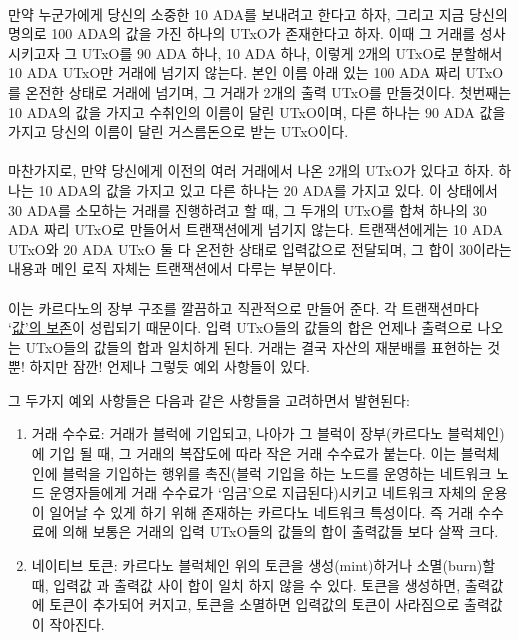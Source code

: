 \documentclass[a4paper, 11pt]{article}
\begin{document}
    \paragraph{} 만약 누군가에게 당신의 소중한 10 ADA를 보내려고 한다고 하자, 그리고 지금 당신의 명의로 100 ADA의 값을 가진 하나의 UTxO가 존재한다고 하자. 이때 그 거래를 성사 시키고자 그 UTxO를 90 ADA 하나, 10 ADA 하나, 이렇게 2개의 UTxO로 분할해서 10 ADA UTxO만 거래에 넘기지 않는다. 본인 이름 아래 있는 100 ADA 짜리 UTxO를 온전한 상태로 거래에 넘기며, 그 거래가 2개의 출력 UTxO를 만들것이다. 첫번째는 10 ADA의 값을 가지고 수취인의 이름이 달린 UTxO이며, 다른 하나는 90 ADA 값을 가지고 당신의 이름이 달린 거스름돈으로 받는 UTxO이다.

    \paragraph{} 마찬가지로, 만약 당신에게 이전의 여러 거래에서 나온 2개의 UTxO가 있다고 하자. 하나는 10 ADA의 값을 가지고 있고 다른 하나는 20 ADA를 가지고 있다. 이 상태에서 30 ADA를 소모하는 거래를 진행하려고 할 때, 그 두개의 UTxO를 합쳐 하나의 30 ADA 짜리 UTxO로 만들어서 트랜잭션에게 넘기지 않는다. 트랜잭션에게는 10 ADA UTxO와 20 ADA UTxO 둘 다 온전한 상태로 입력값으로 전달되며, 그 합이 30이라는 내용과 메인 로직 자체는 트랜잭션에서 다루는 부분이다.

    \paragraph{} 이는 카르다노의 장부 구조를 깔끔하고 직관적으로 만들어 준다. 각 트랜잭션마다 `\uline{값'의 보존}이 성립되기 때문이다. 입력 UTxO들의 값들의 합은 언제나 출력으로 나오는 UTxO들의 값들의 합과 일치하게 된다. 거래는 결국 자산의 재분배를 표현하는 것 뿐! 하지만 잠깐! 언제나 그렇듯 예외 사항들이 있다.

    그 두가지 예외 사항들은 다음과 같은 사항들을 고려하면서 발현된다:
    \begin{enumerate}
        \item 거래 수수료: 거래가 블럭에 기입되고, 나아가 그 블럭이 장부(카르다노 블럭체인)에 기입 될 때, 그 거래의 복잡도에 따라 작은 거래 수수료가 붙는다. 이는 블럭체인에 블럭을 기입하는 행위를 촉진(블럭 기입을 하는 노드를 운영하는 네트워크 노드 운영자들에게 거래 수수료가 `임금'으로 지급된다)시키고 네트워크 자체의 운용이 일어날 수 있게 하기 위해 존재하는 카르다노 네트워크 특성이다. 즉 거래 수수료에 의해 보통은 거래의 입력 UTxO들의 값들의 합이 출력값들 보다 살짝 크다.
        \item 네이티브 토큰: 카르다노 블럭체인 위의 토큰을 생성(mint)하거나 소멸(burn)할 때, 입력값 과 출력값 사이 합이 일치 하지 않을 수 있다. 토큰을 생성하면, 출력값에 토큰이 추가되어 커지고, 토큰을 소멸하면 입력값의 토큰이 사라짐으로 출력값이 작아진다.
    \end{enumerate}
\end{document}
